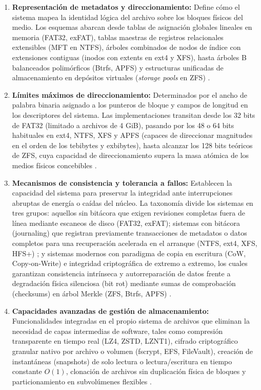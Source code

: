 \documentclass[12pt]{article}
\begin{document}
\begin{enumerate}[noitemsep, topsep=2pt]
    \item \textbf{Representación de metadatos y direccionamiento:} Define cómo el sistema mapea la identidad lógica del archivo sobre los bloques físicos del medio. Los esquemas abarcan desde tablas de asignación globales lineales en memoria (FAT32, exFAT), tablas maestras de registros relacionales extensibles (MFT en NTFS), árboles combinados de nodos de índice con extensiones contiguas (inodos con extents en ext4 y XFS), hasta árboles B balanceados polimórficos (Btrfs, APFS) y estructuras unificadas de almacenamiento en depósitos virtuales (\textit{storage pools} en ZFS) \parencite[\S 11.4, pp.\ 384--387]{silberschatz2006fundamentos}.
    \item \textbf{Límites máximos de direccionamiento:} Determinados por el ancho de palabra binaria asignado a los punteros de bloque y campos de longitud en los descriptores del sistema. Las implementaciones transitan desde los 32 bits de FAT32 (limitado a archivos de 4 GiB), pasando por los 48 o 64 bits habituales en ext4, NTFS, XFS y APFS (capaces de direccionar magnitudes en el orden de los tebibytes y exbibytes), hasta alcanzar los 128 bits teóricos de ZFS, cuya capacidad de direccionamiento supera la masa atómica de los medios físicos concebibles \parencite{openzfs2024docs}.
    \item \textbf{Mecanismos de consistencia y tolerancia a fallos:} Establecen la capacidad del sistema para preservar la integridad ante interrupciones abruptas de energía o caídas del núcleo. La taxonomía divide los sistemas en tres grupos: aquellos sin bitácora que exigen revisiones completas fuera de línea mediante escaneos de disco (FAT32, exFAT); sistemas con bitácora (journaling) que registran previamente transacciones de metadatos o datos completos para una recuperación acelerada en el arranque (NTFS, ext4, XFS, HFS+) \parencite[\S 11.6, p.\ 392]{silberschatz2006fundamentos}; y sistemas modernos con paradigma de copia en escritura (CoW, Copy-on-Write) e integridad criptográfica de extremo a extremo, los cuales garantizan consistencia intrínseca y autorreparación de datos frente a degradación física silenciosa (bit rot) mediante sumas de comprobación (checksums) en árbol Merkle (ZFS, Btrfs, APFS) \parencite{openzfs2024docs}.
    \item \textbf{Capacidades avanzadas de gestión de almacenamiento:} Funcionalidades integradas en el propio sistema de archivos que eliminan la necesidad de capas intermedias de software, tales como compresión transparente en tiempo real (LZ4, ZSTD, LZNT1), cifrado criptográfico granular nativo por archivo o volumen (fscrypt, EFS, FileVault), creación de instantáneas (snapshots) de solo lectura o lectura/escritura en tiempo constante $O(1)$, clonación de archivos sin duplicación física de bloques y particionamiento en subvolúmenes flexibles \parencite{apple2020apfs, kernel2024btrfs}.
\end{enumerate}
\end{document}
